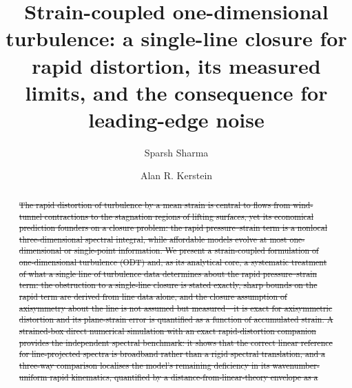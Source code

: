 \documentclass[lineno]{JFM-FLM_Au}
\title{Strain-coupled one-dimensional turbulence: a single-line closure for rapid distortion, its measured limits, and the consequence for leading-edge noise}
\author{Sparsh Sharma\aff{1} \and Alan R. Kerstein\aff{2}}
\affiliation{ %
\aff{1}German Aerospace Center (DLR), 38108 Braunschweig, Germany %
\aff{2}Consultant, Danville, CA 94526, USA %
} %
\providecommand{\DIFdel}[1]{{\protect\color{red}\sout{#1}}} %
\providecommand{\DIFaddbegin}{} %
\providecommand{\DIFaddend}{} %
\providecommand{\DIFdelbegin}{} %
\begin{document}
\DIFaddbegin 

\DIFaddend \maketitle

\begin{abstract}
\DIFdelbegin \DIFdel{The rapid distortion of turbulence by a mean strain is central to flows
from wind-tunnel contractions to the stagnation regions of lifting
surfaces, yet its economical prediction founders on a closure problem: the
rapid pressure--strain term is a nonlocal three-dimensional spectral
integral, while affordable models evolve at most one-dimensional or
single-point information. We present a strain-coupled formulation of
one-dimensional turbulence (ODT) and, as its analytical core, a systematic
treatment of what a single line of turbulence data determines about the
rapid pressure--strain term: the obstruction to a single-line closure is
stated exactly, sharp bounds on the rapid term are derived from line data
alone, and the closure assumption of axisymmetry about the line is not
assumed but measured---it is exact for axisymmetric distortion and its
plane-strain error is quantified as a function of accumulated strain.
A strained-box direct numerical simulation with an exact rapid-distortion
companion provides the independent spectral benchmark: it shows that the
correct linear reference for line-projected spectra is broadband rather
than a rigid spectral translation, and a three-way comparison localises
the model's remaining deficiency in its wavenumber-uniform rapid
kinematics, quantified by a distance-from-linear-theory envelope as a
}
\end{abstract}
\end{document}
